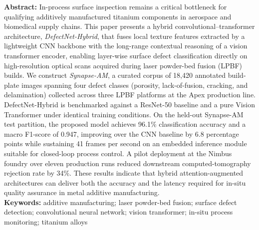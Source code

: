 \documentclass[10pt,a4paper]{article}
\begin{document}
\vspace{10pt}

\begin{tcolorbox}[colback=mdpilight,colframe=mdpiblue,boxrule=0.6pt,arc=1.5pt,left=8pt,right=8pt,top=6pt,bottom=6pt]
\textbf{\color{mdpiblue}Abstract:} In-process surface inspection remains a critical bottleneck for qualifying additively manufactured titanium components in aerospace and biomedical supply chains. This paper presents a hybrid convolutional--transformer architecture, \textit{DefectNet-Hybrid}, that fuses local texture features extracted by a lightweight CNN backbone with the long-range contextual reasoning of a vision transformer encoder, enabling layer-wise surface defect classification directly on high-resolution optical scans acquired during laser powder-bed fusion (LPBF) builds. We construct \textit{Synapse-AM}, a curated corpus of 18,420 annotated build-plate images spanning four defect classes (porosity, lack-of-fusion, cracking, and delamination) collected across three LPBF platforms at the Apex production line. DefectNet-Hybrid is benchmarked against a ResNet-50 baseline and a pure Vision Transformer under identical training conditions. On the held-out Synapse-AM test partition, the proposed model achieves 96.1\% classification accuracy and a macro F1-score of 0.947, improving over the CNN baseline by 6.8 percentage points while sustaining 41 frames per second on an embedded inference module suitable for closed-loop process control. A pilot deployment at the Nimbus foundry over eleven production runs reduced downstream computed-tomography rejection rate by 34\%. These results indicate that hybrid attention-augmented architectures can deliver both the accuracy and the latency required for in-situ quality assurance in metal additive manufacturing.
\vspace{2pt}\\
\textbf{\color{mdpiblue}Keywords:} additive manufacturing; laser powder-bed fusion; surface defect detection; convolutional neural network; vision transformer; in-situ process monitoring; titanium alloys
\end{tcolorbox}

\vspace{6pt}








\end{document}
